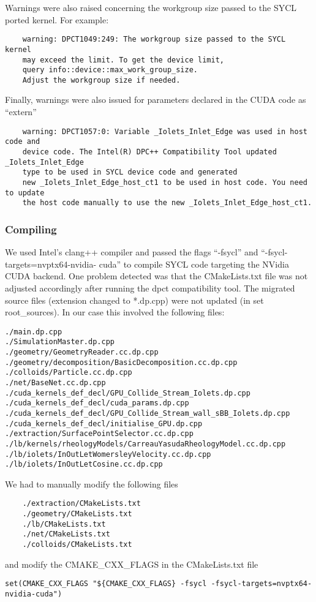 \documentclass[../main]{subfiles}
\begin{document}
Warnings were also raised concerning the workgroup size passed to the SYCL ported kernel.
For example:
\begin{verbatim}
    warning: DPCT1049:249: The workgroup size passed to the SYCL kernel
    may exceed the limit. To get the device limit,
    query info::device::max_work_group_size.
    Adjust the workgroup size if needed.
\end{verbatim}

Finally, warnings were also issued for parameters declared in the CUDA code as ``extern''
\begin{verbatim}
    warning: DPCT1057:0: Variable _Iolets_Inlet_Edge was used in host code and
    device code. The Intel(R) DPC++ Compatibility Tool updated _Iolets_Inlet_Edge
    type to be used in SYCL device code and generated
    new _Iolets_Inlet_Edge_host_ct1 to be used in host code. You need to update
    the host code manually to use the new _Iolets_Inlet_Edge_host_ct1.
\end{verbatim}

\subsubsection{Compiling}
We used Intel’s clang++ compiler and passed the flags ``-fsycl'' and ``-fsycl-targets=nvptx64-nvidia-
cuda'' to compile SYCL code targeting the NVidia CUDA backend.
One problem detected was that the CMakeLists.txt file was not adjusted accordingly after running the dpct compatibility tool.
The migrated source files (extension changed to *.dp.cpp) were not updated (in set root\_sources).
In our case this involved the following files:
\begin{verbatim}
./main.dp.cpp
./SimulationMaster.dp.cpp
./geometry/GeometryReader.cc.dp.cpp
./geometry/decomposition/BasicDecomposition.cc.dp.cpp
./colloids/Particle.cc.dp.cpp
./net/BaseNet.cc.dp.cpp
./cuda_kernels_def_decl/GPU_Collide_Stream_Iolets.dp.cpp
./cuda_kernels_def_decl/cuda_params.dp.cpp
./cuda_kernels_def_decl/GPU_Collide_Stream_wall_sBB_Iolets.dp.cpp
./cuda_kernels_def_decl/initialise_GPU.dp.cpp
./extraction/SurfacePointSelector.cc.dp.cpp
./lb/kernels/rheologyModels/CarreauYasudaRheologyModel.cc.dp.cpp
./lb/iolets/InOutLetWomersleyVelocity.cc.dp.cpp
./lb/iolets/InOutLetCosine.cc.dp.cpp
\end{verbatim}

We had to manually modify the following files
\begin{verbatim}
    ./extraction/CMakeLists.txt
    ./geometry/CMakeLists.txt
    ./lb/CMakeLists.txt
    ./net/CMakeLists.txt
    ./colloids/CMakeLists.txt
\end{verbatim}
and modify the CMAKE\_CXX\_FLAGS in the CMakeLists.txt file
\begin{verbatim}
set(CMAKE_CXX_FLAGS "${CMAKE_CXX_FLAGS} -fsycl -fsycl-targets=nvptx64-nvidia-cuda")
\end{verbatim}
\end{document}
